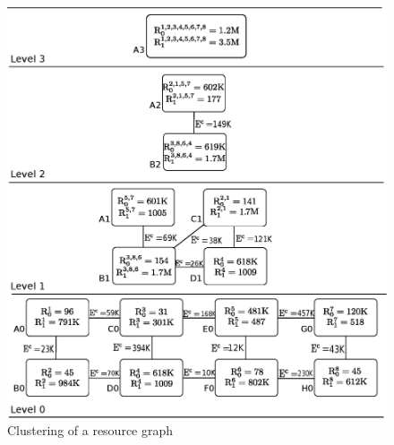 \begin{itemize}



\end{itemize}

\begin{figure}[ht]
  \includegraphics[scale=0.43]{./figures/resource}
  \caption{Clustering of a resource graph}
  \label{fig:res}
\end{figure}

